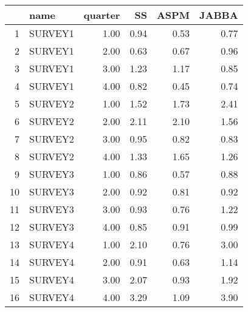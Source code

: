 \begin{table}[ht]
\centering
\begin{tabular}{rlrrrr}
  \hline
 & name & quarter & SS & ASPM & JABBA \\ 
  \hline
1 & SURVEY1 & 1.00 & 0.94 & 0.53 & 0.77 \\ 
  2 & SURVEY1 & 2.00 & 0.63 & 0.67 & 0.96 \\ 
  3 & SURVEY1 & 3.00 & 1.23 & 1.17 & 0.85 \\ 
  4 & SURVEY1 & 4.00 & 0.82 & 0.45 & 0.74 \\ 
  5 & SURVEY2 & 1.00 & 1.52 & 1.73 & 2.41 \\ 
  6 & SURVEY2 & 2.00 & 2.11 & 2.10 & 1.56 \\ 
  7 & SURVEY2 & 3.00 & 0.95 & 0.82 & 0.83 \\ 
  8 & SURVEY2 & 4.00 & 1.33 & 1.65 & 1.26 \\ 
  9 & SURVEY3 & 1.00 & 0.86 & 0.57 & 0.88 \\ 
  10 & SURVEY3 & 2.00 & 0.92 & 0.81 & 0.92 \\ 
  11 & SURVEY3 & 3.00 & 0.93 & 0.76 & 1.22 \\ 
  12 & SURVEY3 & 4.00 & 0.85 & 0.91 & 0.99 \\ 
  13 & SURVEY4 & 1.00 & 2.10 & 0.76 & 3.00 \\ 
  14 & SURVEY4 & 2.00 & 0.91 & 0.63 & 1.14 \\ 
  15 & SURVEY4 & 3.00 & 2.07 & 0.93 & 1.92 \\ 
  16 & SURVEY4 & 4.00 & 3.29 & 1.09 & 3.90 \\ 
   \hline
\end{tabular}
\end{table}
